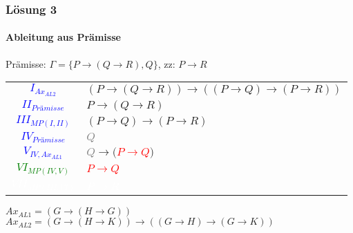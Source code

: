 \begin{frame}
	\frametitle{Lösung 3}
	\framesubtitle{Ableitung aus Prämisse}
	Prämisse: $\Gamma =\{P\rightarrow(Q\rightarrow R), Q\}$, zz: $P\rightarrow R$\\
	\begin{tabular}{cl}
		\textcolor{blue}{$I_{Ax_{AL2}}$}       & $(P\rightarrow(Q\rightarrow R))\rightarrow((P\rightarrow Q)\rightarrow(P\rightarrow R))$ \\
		\textcolor{blue}{$II_{Prämisse}$}      & $P\rightarrow(Q\rightarrow R)$                                                           \\
		\textcolor{blue}{$III_{MP(I, II)}$}    & $(P\rightarrow Q)\rightarrow(P\rightarrow R)$                                            \\
		\textcolor{blue}{$IV_{Prämisse}$}      & \textcolor{gray}{$Q$}                                                                    \\
		\textcolor{blue}{$V_{IV, Ax_{AL1}}$}   & \textcolor{gray}{$Q$}$\rightarrow($\textcolor{red}{$P\rightarrow Q$}$)$                  \\
		\textcolor{green}{$VI_{MP(IV, V)}$}    & \textcolor{red}{$P\rightarrow Q$}                                                        \\
		\textcolor{white}{$VII_{MP(III, VI)}$} & \textcolor{white}{$P\rightarrow R$}                                                      \\
	\end{tabular}
	$Ax_{AL1} = (G\rightarrow(H\rightarrow G))$\\
	$Ax_{AL2} = (G\rightarrow(H\rightarrow K))\rightarrow((G\rightarrow H)\rightarrow(G\rightarrow K))$\\
\end{frame}
